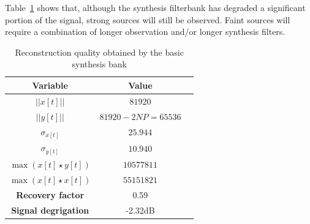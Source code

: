 \documentclass[a4paper,10pt]{article}
\begin{document}
Table~\ref{tab_quality} shows that, although the synthesis filterbank has degraded a significant portion of the signal, strong sources will still be observed. Faint
sources will require a combination of longer observation and/or longer synthesis filters. 
\begin{table}
  \centering
  \begin{tabular}{|c|c|c|}
    \hline
    \textbf{Variable} & \textbf{Value}  \\
    \hline
    $||x[t]||$ & $81920$ \\
    \hline
    $||y[t]||$ & $81920 - 2NP=65536$ \\
    \hline
    $\sigma_{x[t]}$ & $25.944$ \\
    \hline
    $\sigma_{y[t]}$ & $10.940$ \\
    \hline
    $\max{(x[t]\star y[t])}$ & $10 577 811$ \\
    \hline
    $\max{(x[t]\star x[t])}$ & $55 151 821$ \\
    \hline
    \textbf{Recovery factor} & 0.59 \\
    \hline
    \textbf{Signal degrigation} & -2.32dB \\
    \hline
  \end{tabular}
  \caption[Reconstruction quality]{Reconstruction quality obtained by the basic synthesis bank}
  \label{tab_quality}
\end{table}
\end{document}
